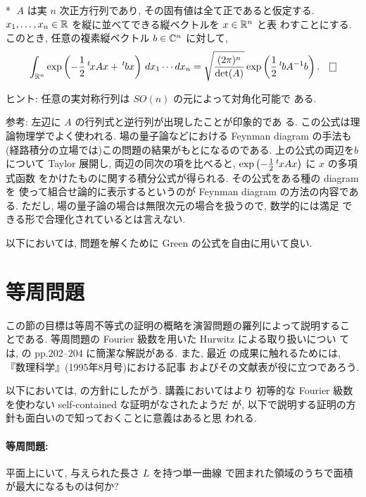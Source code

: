 \documentclass[12pt,twoside]{jarticle}
\def\qstar#1{$\!\!\!$#1$\;$}
\def\R{{\Bbb R}} %
\def\C{{\Bbb C}} %
\def\transposed#1{\,\vphantom{#1}^t\mskip-1.5mu{#1}} %
\def\det{\mathop{\text{\rm det}}\nolimits}          %
\begin{document}
\begin{question}\qstar{*}
  $A$ は実 $n$ 次正方行列であり, その固有値は全て正であると仮定する. 
  $x_1,\dots,x_n\in\R$ を縦に並べてできる縦ベクトルを $x\in\R^n$ と表
  わすことにする. このとき, 任意の複素縦ベクトル $b \in \C^n$ に対して,
  \[
    \int_{\R^n}
      \exp\left( - \frac{1}{2}\transposed{x}Ax + \transposed{b}x \right)
    \,dx_1\cdots dx_n
    =
    \sqrt{\frac{(2\pi)^n}{\det(A)}}
    \exp\left( \frac{1}{2}\transposed{b}A^{-1}b \right).
  \qed
  \]
\end{question}

\noindent ヒント: 任意の実対称行列は $SO(n)$ の元によって対角化可能で
ある.

\noindent 参考: 左辺に $A$ の行列式と逆行列が出現したことが印象的であ
る. この公式は理論物理学でよく使われる. 場の量子論などにおける Feynman
diagram の手法も(経路積分の立場では)この問題の結果がもとになるのである. 
上の公式の両辺を$b$ について Taylor 展開し, 両辺の同次の項を比べると,
$\exp\left( - \frac{1}{2}\transposed{x}Ax \right)$ に $x$ の多項式函数
をかけたものに関する積分公式が得られる. その公式をある種の diagram を
使って組合せ論的に表示するというのが Feynman diagram の方法の内容であ
る. ただし, 場の量子論の場合は無限次元の場合を扱うので, 数学的には満足
できる形で合理化されているとは言えない.

\medskip

以下においては, 問題を解くために Green の公式を自由に用いて良い.


\section{等周問題}

この節の目標は等周不等式の証明の概略を演習問題の羅列によって説明するこ
とである. 等周問題の Fourier 級数を用いた Hurwitz による取り扱いについ
ては, \cite{Mizohata}{} の pp.202--204 に簡潔な解説がある. また, 最近
の成果に触れるためには, 『数理科学』(1995年8月号)における記事 
\cite{Urakawa}{} およびその文献表が役に立つであろう. 

以下においては, \cite{Urakawa}{} の方針にしたがう. 講義においてはより
初等的な Fourier 級数を使わない self-contained な証明がなされたようだ
が, 以下で説明する証明の方針も面白いので知っておくことに意義はあると思
われる.

\paragraph{等周問題:} 平面上にいて, 与えられた長さ $L$ を持つ単一曲線
で囲まれた領域のうちで面積が最大になるものは何か?
\end{document}
